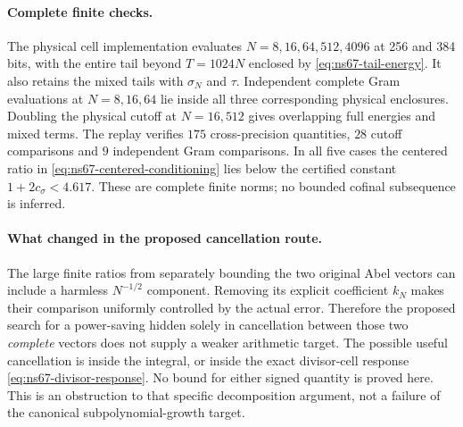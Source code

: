 \paragraph{Complete finite checks.}
The physical cell implementation evaluates $N=8,16,64,512,4096$ at
256 and 384 bits, with the entire tail beyond $T=1024N$ enclosed by
\eqref{eq:ns67-tail-energy}. It also retains the mixed tails with
$\sigma_N$ and $\tau$. Independent complete Gram evaluations at
$N=8,16,64$ lie inside all three corresponding physical enclosures.
Doubling the physical cutoff at $N=16,512$ gives overlapping full
energies and mixed terms. The replay verifies $175$ cross-precision
quantities, $28$ cutoff comparisons and $9$ independent Gram comparisons.
In all five cases the centered ratio in
\eqref{eq:ns67-centered-conditioning} lies below the certified
constant $1+2c_\sigma<4.617$. These are complete finite norms;
no bounded cofinal subsequence is inferred.

\paragraph{What changed in the proposed cancellation route.}
The large finite ratios from separately bounding the two original Abel
vectors can include a harmless $N^{-1/2}$ component. Removing its explicit
coefficient $k_N$ makes their comparison uniformly controlled by the
actual error. Therefore the proposed search for a power-saving hidden
solely in cancellation between those two \emph{complete} vectors does
not supply a weaker arithmetic target. The possible useful cancellation
is inside the integral, or inside the exact divisor-cell response
\eqref{eq:ns67-divisor-response}. No bound for either signed quantity
is proved here. This is an obstruction to that specific decomposition
argument, not a failure of the canonical subpolynomial-growth target.
